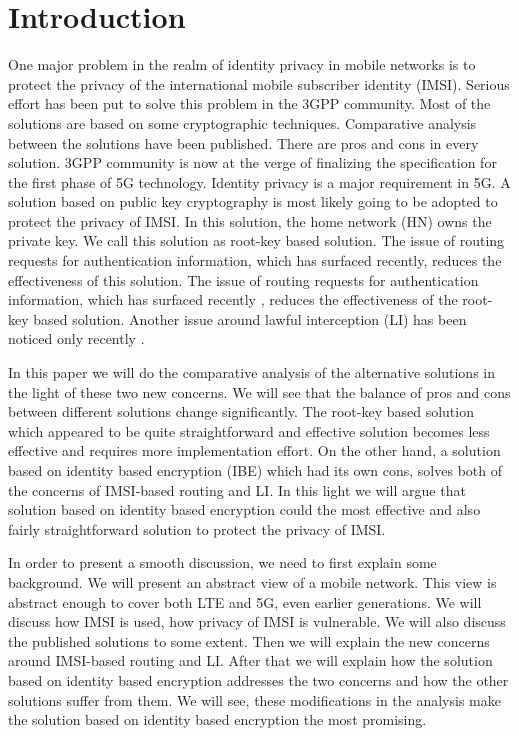 \documentclass[conference]{IEEEtran}
\begin{document}
\section{Introduction} \label{intro}
One major problem in the realm of identity privacy in mobile networks is to protect the privacy of the international mobile subscriber identity (IMSI). Serious effort has been put to solve this problem in the 3GPP community. Most of the solutions are based on some cryptographic techniques. Comparative analysis between the solutions have been published. There are pros and cons in every solution. 3GPP community is now at the verge of finalizing the specification for the first phase of 5G technology. Identity privacy is a major requirement in 5G. A solution based on public key cryptography is most likely going to be adopted to protect the privacy of IMSI. In this solution, the home network (HN) owns the private key. We call this solution as root-key based solution. The issue of routing requests for authentication information, which has surfaced recently, reduces the effectiveness of this solution. The issue of routing requests for authentication information, which has surfaced recently \cite{SUCIRouting}, reduces the effectiveness of the root-key based solution. Another issue around lawful interception (LI) has been noticed only recently \cite{SUCIRouting}.

In this paper we will do the comparative analysis of the alternative solutions in the light of these two new concerns. We will see that the balance of pros and cons between different solutions change significantly. The root-key based solution which appeared to be quite straightforward and effective solution becomes less effective and requires more implementation effort. On the other hand, a solution based on identity based encryption (IBE) which had its own cons, solves both of the concerns of IMSI-based routing and LI. In this light we will argue that solution based on identity based encryption could the most effective and also fairly straightforward solution to protect the privacy of IMSI.

In order to present a smooth discussion, we need to first explain some background. We will present an abstract view of a mobile network. This view is abstract enough to cover both LTE and 5G, even earlier generations. We will discuss how IMSI is used, how privacy of IMSI is vulnerable. We will also discuss the published solutions to some extent. Then we will explain the new concerns around IMSI-based routing and LI. After that we will explain how the solution based on identity based encryption addresses the two concerns and how the other solutions suffer from them. We will see, these modifications in the analysis make the solution based on identity based encryption the most promising.
\end{document}
